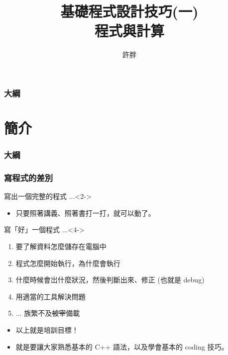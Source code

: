 \documentclass[utf8]{beamer}
\begin{document}
\begin{CJK}{UTF8}{bkai}

\title{基礎程式設計技巧(一)\\程式與計算}
\author{許胖}

\begin{frame}
  \titlepage
\end{frame}
\begin{frame}
  \frametitle{大綱}
  \begin{multicols}{2}
    \tableofcontents
  \end{multicols}
\end{frame}

\section{簡介}
\begin{frame}
  \frametitle{大綱}
  \begin{multicols}{2}
    \tableofcontents[currentsection]
  \end{multicols}
\end{frame}

\begin{frame}
  \frametitle{寫程式的差別}
  \begin{block}{寫出一個完整的程式 ...}<2->
    \begin{itemize}[<3->]
    \item 只要照著講義、照著書打一打，就可以動了。
    \end{itemize}
  \end{block}
  \begin{exampleblock}{寫「好」一個程式 ...}<4->
    \begin{enumerate}
    \item<5-> 要了解資料怎麼儲存在電腦中
    \item<6-> 程式怎麼開始執行，為什麼會執行
    \item<7-> 什麼時候會岀什麼狀況，然後判斷出來、修正 (也就是 debug)
    \item<8-> 用適當的工具解決問題
    \item<9-> ... 族繁不及\sout{被宰}備載
    \end{enumerate}
  \end{exampleblock}
  \begin{itemize}
  \item<10-> 以上就是\alert{培訓目標}！
  \item<11-> 就是要讓大家熟悉\alert{基本的 C++ 語法}，以及學會基本的 \alert{coding 技巧}。
  \end{itemize}
\end{frame}


\end{CJK}
\end{document}
